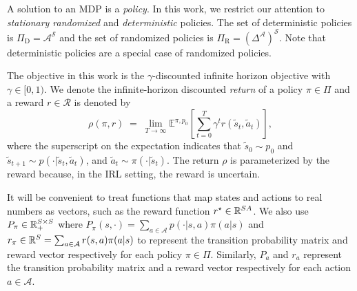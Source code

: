 A solution to an MDP is a \emph{policy}. In this work, we restrict our attention to \emph{stationary randomized} and \emph{deterministic} policies. The set of deterministic policies is $\Pi_{\mathrm{D}}= \mathcal{A}^{\mathcal{S}}$ and the set of randomized policies is $\Pi_{\mathrm{R}} = {\left(\Delta^{\mathcal{A}}\right)}^{\mathcal{S}}$. Note that deterministic policies are a special case of randomized policies. 



The objective in this work is the $\gamma$-discounted infinite horizon objective with $\gamma \in [0,1)$. We denote the infinite-horizon discounted \emph{return} of a policy $\pi \in \Pi$ and a reward $r \in \mathcal{R}$ is denoted by 
\[
  \rho(\pi, r)
  \;=\; \lim_{T\to\infty} \mathbb{E}^{\pi, p_0} \left[   \sum_{t=0}^{T} \gamma^t r(\tilde{s}_t,\tilde{a}_t) \right], 
\]
where the superscript on the expectation indicates that $\tilde{s}_0 \sim p_0$ and $\tilde{s}_{t+1} \sim p(\cdot | \tilde{s}_t,\tilde{a}_t)$, and $\tilde{a}_t \sim \pi(\cdot | \tilde{s}_t)$.  The return $\rho$ is parameterized by the reward because, in the IRL setting, the reward is uncertain. 


It will be convenient to treat functions that map states and actions to real numbers as vectors, such as the reward function $r^{\star} \in \mathbb{R}^{SA}$. We also use $P_{\pi} \in \mathbb{R}_+^{S \times S}$ where $P_{\pi}(s,\cdot) = \sum_{a \in \mathcal{A}} p(\cdot | s, a) \pi(a|s)$ and $r_{\pi}\in \mathbb{R}^S = \sum_{a \in \mathcal{A}}r(s, a)\pi(a|s)$ to represent the transition probability matrix and reward vector respectively for each policy $\pi\in \Pi$. Similarly, $P_a$ and $r_a$ represent the transition probability matrix and a reward vector respectively for each action $a\in \mathcal{A}$.

